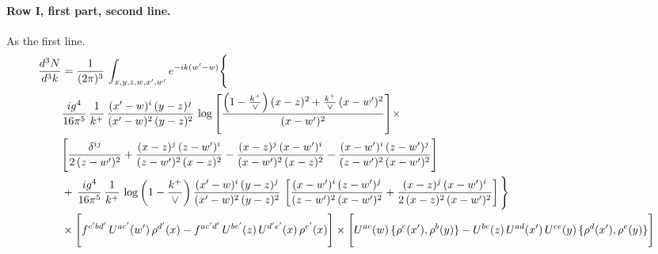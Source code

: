 \documentclass[10pt]{article}
\numberwithin{equation}{section}
\begin{document}
\paragraph{Row I, first part, second line.}
As the first line.
\begin{align}
\frac{d^{3}N}{d^{3}k} & =  \frac{1}{(2\pi)^{3}}\,\int_{x,y,z,w,x',w^{\prime}} e^{-ik(w^{\prime}-w)}\Bigg\{\notag \\
&  \frac{ig^{4}}{16\pi^{5}}\,\frac{1}{k^{+}}\, \frac{(x'-w)^{i}\,(y-z)^{j}}{(x'-w)^{2}\,(y-z)^{2}}\,\log{\left[\frac{\left(1-\frac{k^{+}}{\vee}\right)(x-z)^{2}+\frac{k^{+}}{\vee}\,(x-w')^{2}}{(x-w')^{2}}\right]}\times\notag \\ &  \Bigg[\frac{\delta^{ij}}{2\,(z-w')^{2}}+\frac{(x-z)^{j}\,(z-w')^{i}}{(z-w')^{2}\,(x-z)^{2}}-\frac{(x-z)^{j}\,(x-w')^{i}}{(x-w')^{2}\,(x-z)^{2}}-\frac{(x-w')^{i}\,(z-w')^{j}}{(z-w')^{2}\,(x-w')^{2}}\Bigg] \notag \\
& +\,\frac{ig^{4}}{16\pi^{5}}\,\frac{1}{k^{+}}\,\log{\left(1-\frac{k^{+}}{\vee}\right)}\,\frac{(x'-w)^{i}\,(y-z)^{j}}{(x'-w)^{2}\,(y-z)^{2}}\,\left[\frac{(x-w')^{i}\,(z-w')^{j}}{(z-w')^{2}\,(x-w')^{2}}+\frac{(x-z)^{j}\,(x-w')^{i}}{2\,(x-z)^{2}\, (x-w')^{2}}\right]\Bigg\} \notag \\ & \times\Bigg[f^{c'bd'}\,U^{ac'}(w')\,\rho^{d'}(x)-f^{ac'd'}\, U^{bc'}(z)\,U^{d'e'}(x)\,\rho^{e'}(x)\Bigg] \times \Bigg[U^{ac}(w)\,\{\rho^{c}(x'),\rho^{b}(y)\}-U^{bc}(z)\,U^{ad}(x')\,U^{ce}(y)\, \{\rho^{d}(x'),\rho^{e}(y)\}\Bigg] \label{eq:R:G2I1B}
\end{align}
\end{document}
